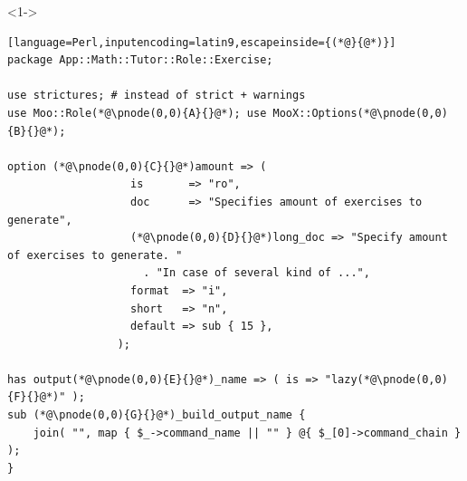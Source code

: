 \documentclass[ngerman,xcolor={table,dvipsnames},smaller,compress,hyperref={bookmarks,colorlinks}]{beamer}
\begin{document}
\begin{frame}[t,fragile]

\begin{block}<1->{}
\scriptsize
\begin{lstlisting}[language=Perl,inputencoding=latin9,escapeinside={(*@}{@*)}]
package App::Math::Tutor::Role::Exercise;

use strictures; # instead of strict + warnings
use Moo::Role(*@\pnode(0,0){A}{}@*); use MooX::Options(*@\pnode(0,0){B}{}@*);

option (*@\pnode(0,0){C}{}@*)amount => (
                   is       => "ro",
                   doc      => "Specifies amount of exercises to generate",
                   (*@\pnode(0,0){D}{}@*)long_doc => "Specify amount of exercises to generate. "
                     . "In case of several kind of ...",
                   format  => "i",
                   short   => "n",
                   default => sub { 15 },
                 );

has output(*@\pnode(0,0){E}{}@*)_name => ( is => "lazy(*@\pnode(0,0){F}{}@*)" );
sub (*@\pnode(0,0){G}{}@*)_build_output_name {
    join( "", map { $_->command_name || "" } @{ $_[0]->command_chain } );
}
\end{lstlisting}
\end{block}

\begin{itemize}
\end{itemize}

\end{frame}
\end{document}
